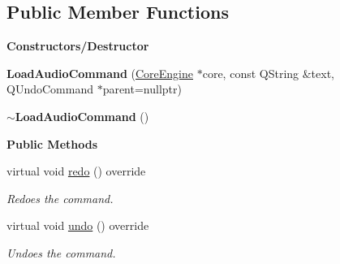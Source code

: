\subsection*{Public Member Functions}
\begin{Indent}\textbf{ Constructors/\+Destructor}\par
\begin{DoxyCompactItemize}
\item 
\mbox{\label{classrev_1_1_load_audio_command_ae47c76d0576bff29ff62108926881a8d}} 
{\bfseries Load\+Audio\+Command} (\mbox{\hyperlink{classrev_1_1_core_engine}{Core\+Engine}} $\ast$core, const Q\+String \&text, Q\+Undo\+Command $\ast$parent=nullptr)
\item 
\mbox{\label{classrev_1_1_load_audio_command_ad2191d0b27c0d78219bd72ee4ea80d0f}} 
{\bfseries $\sim$\+Load\+Audio\+Command} ()
\end{DoxyCompactItemize}
\end{Indent}
\begin{Indent}\textbf{ Public Methods}\par
\begin{DoxyCompactItemize}
\item 
\mbox{\label{classrev_1_1_load_audio_command_a692bb84ac13aaabd47dcfaf337040a39}} 
virtual void \mbox{\hyperlink{classrev_1_1_load_audio_command_a692bb84ac13aaabd47dcfaf337040a39}{redo}} () override
\begin{DoxyCompactList}\small\item\em Redoes the command. \end{DoxyCompactList}\item 
\mbox{\label{classrev_1_1_load_audio_command_a3de331c12b3a1e5ec1cfe3c38ec4dc58}} 
virtual void \mbox{\hyperlink{classrev_1_1_load_audio_command_a3de331c12b3a1e5ec1cfe3c38ec4dc58}{undo}} () override
\begin{DoxyCompactList}\small\item\em Undoes the command. \end{DoxyCompactList}\end{DoxyCompactItemize}
\end{Indent}
